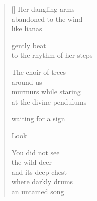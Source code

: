\documentclass[12pt,a4paper]{article}
\begin{document}
\thispagestyle{empty}

\poemtitle{}

\settowidth{\versewidth}{to the rhythm of her steps}

\bigskip

\begin{verse}[\versewidth]
  Her dangling arms \\
  abandoned to the wind \\
  like lianas

  gently beat \\
  to the rhythm of her steps

  The choir of trees \\
  around us \\
  murmurs while staring \\
  at the divine pendulums

  waiting for a sign

  Look

  You did not see \\
  the wild deer \\
  and its deep chest \\
  where darkly drums \\
  an untamed song
  \end{verse}
\end{document}
